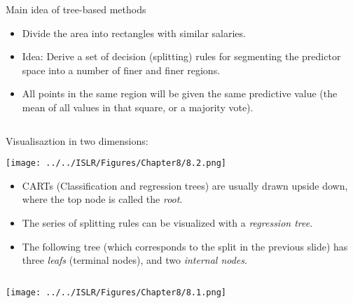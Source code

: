 \documentclass[10pt,ignorenonframetext,]{beamer}
\begin{document}
\begin{frame}

\begin{block}{Main idea of tree-based methods}

\vspace{2mm}

\begin{itemize}
\item
  Divide the area into rectangles with similar salaries.
\item
  Idea: Derive a set of decision (splitting) rules for segmenting the
  predictor space into a number of finer and finer regions.
\item
  All points in the same region will be given the same predictive value
  (the mean of all values in that square, or a majority vote).
\end{itemize}

\(~\)

Visualisaztion in two dimensions:

\centering

\texttt{[image: ../../ISLR/Figures/Chapter8/8.2.png]}

\end{block}

\end{frame}

\begin{frame}

\begin{itemize}
\item
  CARTs (Classification and regression trees) are usually drawn upside
  down, where the top node is called the \emph{root}.
\item
  The series of splitting rules can be visualized with a
  \emph{regression tree}.
\item
  The following tree (which corresponds to the split in the previous
  slide) has three \emph{leafs} (terminal nodes), and two \emph{internal
  nodes}.
\end{itemize}

\(~\)

\centering

\texttt{[image: ../../ISLR/Figures/Chapter8/8.1.png]}

\end{frame}
\end{document}
